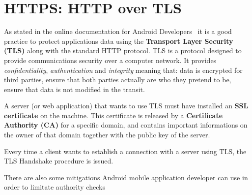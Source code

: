	\section{HTTPS: HTTP over TLS}
		\par As stated in the online documentation for Android Developers~\cite{android_dev_tips} it is a good practice to protect applications data using the \textbf{Transport Layer Security (TLS)} along with the standard HTTP protocol. \newline
		TLS is a protocol designed to provide communications security over a computer network.  
		It provides \textit{confidentiality}, \textit{authentication} and \textit{integrity} meaning that: data is encrypted for third parties, ensure that both parties actually are who they pretend to be, ensure that data is not modified in the transit.
		\par A server (or web application) that wants to use TLS must have installed an \textbf{SSL certificate} on the machine. This certificate is released by a \textbf{Certificate Authority (CA)} for a specific domain, and contains important informations on the owner of that domain together with the public key of the server.  
		\par Every time a client wants to establish a connection with a server using TLS, the TLS Handshake procedure is issued.	
		\par There are also some mitigations Android mobile application developer can use in order to limitate authority checks
		
